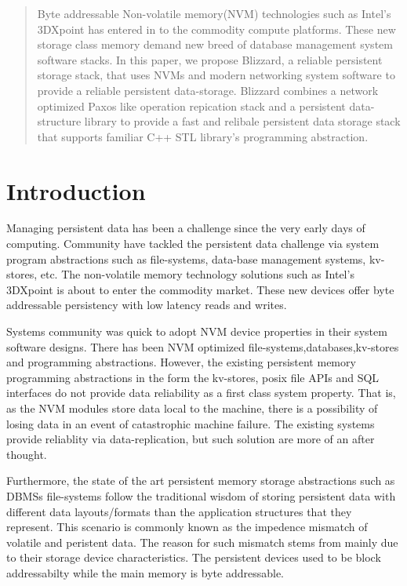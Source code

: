 \begin{abstract}
	Byte addressable Non-volatile memory(NVM) technologies such as Intel's
3DXpoint has entered in to the commodity compute platforms. These
new storage class memory demand new breed of database management system 
software stacks. 
In this paper, we propose Blizzard, a reliable persistent storage stack,
that uses NVMs and modern networking system software to provide a reliable
persistent data-storage. Blizzard combines a network optimized Paxos like 
operation repication stack and a persistent data-structure library to 
provide a fast and relibale persistent data storage stack that supports
familiar C++ STL library's programming abstraction.

\end{abstract}

\section{Introduction}

Managing persistent data has been a challenge since the very early days of computing.
Community have tackled the persistent data challenge via system program abstractions
such as file-systems, data-base management systems, kv-stores, etc.
The non-volatile memory technology solutions such as Intel's 3DXpoint is about to
enter the commodity market. These new devices offer byte addressable persistency
with low latency reads and writes.

Systems community was quick to adopt NVM device properties in their system software
designs. There has been NVM optimized file-systems,databases,kv-stores and programming abstractions.
However, the existing persistent memory programming abstractions in the form the kv-stores, posix 
file APIs and SQL interfaces do not provide data reliability as a first class system
property. That is, as the NVM modules store data local to the machine, there is a possibility of 
losing data in an event of catastrophic machine failure. The existing systems provide reliablity
via data-replication, but such solution are more of an after thought.

Furthermore, the state of the art persistent memory storage abstractions such as DBMSs file-systems
follow the traditional wisdom of storing persistent data with different data layouts/formats
than the application structures that they represent. This scenario is commonly known as 
the impedence mismatch of volatile and peristent data. The reason for such mismatch stems 
from mainly due to their storage device characteristics. The persistent devices used to be
block addressabilty while the main memory is byte addressable.

